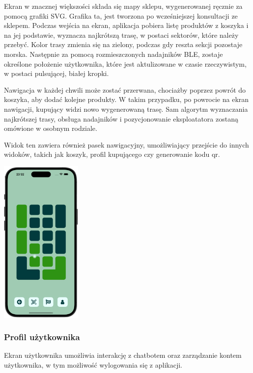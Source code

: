 Ekran w znacznej większości składa się mapy sklepu, wygenerowanej ręcznie za pomocą grafiki SVG. Grafika ta, jest tworzona po wcześniejszej konsultacji ze sklepem. Podczas wejścia na ekran, aplikacja pobiera listę produktów z koszyka i na jej podstawie, wyznacza najkrótszą trasę, w postaci sektorów, które należy przebyć. Kolor trasy zmienia się na zielony, podczas gdy reszta sekcji pozostaje morska. Następnie za pomocą rozmieszczonych nadajników BLE, zostaje określone położenie użytkownika, które jest aktulizowane w czasie rzeczywistym, w postaci pulsującej, białej kropki.

Nawigacja w każdej chwili może zostać przerwana, chociażby poprzez powrót do koszyka, aby dodać kolejne produkty. W takim przypadku, po powrocie na ekran nawigacji, kupujący widzi nowo wygenerowaną trasę. Sam algorytm wyznaczania najkrótszej trasy, obsługa nadajników i pozycjonowanie eksploatatora zostaną omówione w osobnym rodziale.

Widok ten zawiera również pasek nawigacyjny, umożliwiający przejście do innych widoków, takich jak koszyk, profil kupującego czy generowanie kodu qr.

\begin{center}
    \includegraphics[width=0.3\textwidth]{images/front/navigation_moved.png}
\end{center}

\subsubsection{Profil użytkownika}

Ekran użytkownika umożliwia interakcję z chatbotem oraz zarządzanie kontem użytkownika, w tym możliwość wylogowania się z aplikacji.

